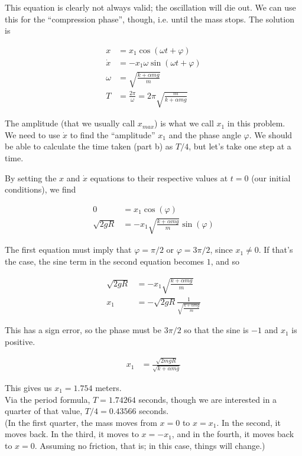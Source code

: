 \documentclass[8.01x]{subfiles}
\begin{document}
This equation is clearly not always valid; the oscillation will die out. We can use this for the ``compression phase'', though, i.e. until the mass stops. The solution is

\begin{align}
x &= x_1 \cos (\omega t + \varphi)\\
\dot{x} &= -x_1 \omega \sin(\omega t + \varphi)\\
\omega &= \sqrt{\frac{k + \alpha m g}{m}}\\
T &= \frac{2 \pi}{\omega} = 2\pi \sqrt{\frac{m}{k + \alpha m g}}
\end{align}

The amplitude (that we usually call $x_{max}$) is what we call $x_1$ in this problem.\\
We need to use $\dot{x}$ to find the ``amplitude'' $x_1$ and the phase angle $\varphi$. We should be able to calculate the time taken (part b) as $T/4$, but let's take one step at a time.

By setting the $x$ and $\dot{x}$ equations to their respective values at $t = 0$ (our initial conditions), we find

\begin{align}
0 &= x_1 \cos (\varphi)\\
\sqrt{2 g R} &= - x_1 \sqrt{\frac{k + \alpha m g}{m}} \sin (\varphi)
\end{align}

The first equation must imply that $\varphi = \pi/2$ or $\varphi = 3\pi/2$, since $x_1 \neq 0$. If that's the case, the sine term in the second equation becomes $1$, and so

\begin{align}
\sqrt{2 g R} &= - x_1 \sqrt{\frac{k + \alpha m g}{m}}\\
x_1 &= -\sqrt{2 g R} \frac{1}{\sqrt{\frac{k + \alpha m g}{m}}}
\end{align}

This has a sign error, so the phase must be $3 \pi/2$ so that the sine is $-1$ and $x_1$ is positive.

\begin{align}
x_1 &= \frac{\sqrt{2 m g R}}{\sqrt{k + \alpha m g}}
\end{align}

This gives us $x_1 = 1.754$ meters.\\
Via the period formula, $T = 1.74264$ seconds, though we are interested in a quarter of that value, $T/4 = 0.43566$ seconds.\\
(In the first quarter, the mass moves from $x=0$ to $x = x_1$. In the second, it moves back. In the third, it moves to $x = -x_1$, and in the fourth, it moves back to $x = 0$. Assuming no friction, that is; in this case, things will change.)
\end{document}
